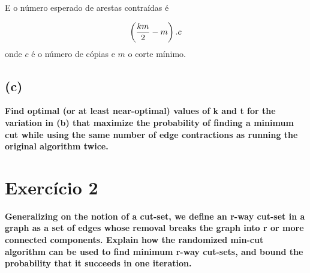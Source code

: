 \documentclass{article}
\begin{document}
E o número esperado de arestas contraídas é

\begin{equation}
    \notag
    \left(\frac{km}{2} - m\right).c
\end{equation} 
onde $c$ é o número de cópias e $m$ o corte mínimo.
\subsection*{(c)} 
\textbf{Find optimal (or at least near-optimal) values of k and t for the variation
in (b) that maximize the probability of finding a minimum cut while using the same number
of edge contractions as running the original algorithm twice.}

\section{Exercício 2}
\textbf{Generalizing on the notion of a cut-set, we define an r-way cut-set in a
graph as a set of edges whose removal breaks the graph into r or more connected 
components. Explain how the randomized min-cut algorithm can be used to find minimum
r-way cut-sets, and bound the probability that it succeeds in one iteration.}
\end{document}
